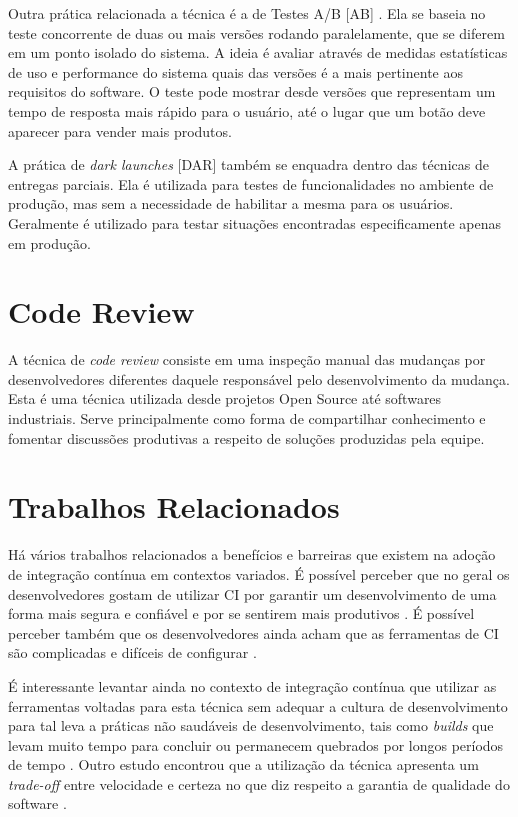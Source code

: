 Outra prática relacionada a técnica é a de Testes A/B [AB] \cite{testsAB}. Ela se baseia no teste concorrente de duas ou mais versões rodando paralelamente, que se diferem em um ponto isolado do sistema. A ideia é avaliar através de medidas estatísticas de uso e performance do sistema quais das versões é a mais pertinente aos requisitos do software. O teste pode mostrar desde versões que representam um tempo de resposta mais rápido para o usuário, até o lugar que um botão deve aparecer para vender mais produtos.

A prática de \emph{dark launches} [DAR] \cite{devAndDeploymentFB} também se enquadra dentro das técnicas de entregas parciais. Ela é utilizada para testes de funcionalidades no ambiente de produção, mas sem a necessidade de habilitar a mesma para os usuários. Geralmente é utilizado para testar situações encontradas especificamente apenas em produção.  


\section{Code Review}

A técnica de \emph{code review} \cite{codeReview} consiste em uma inspeção manual das mudanças por desenvolvedores diferentes daquele responsável pelo desenvolvimento da mudança. Esta é uma técnica utilizada desde projetos Open Source até softwares industriais. Serve principalmente como forma de compartilhar conhecimento e fomentar discussões produtivas a respeito de soluções produzidas pela equipe.

\section{Trabalhos Relacionados}

Há vários trabalhos relacionados a benefícios e barreiras que existem na adoção de integração contínua em contextos variados. É possível perceber que no geral os desenvolvedores gostam de utilizar CI por garantir um desenvolvimento de uma forma mais segura e confiável \cite{googleCi} e por se sentirem mais produtivos \cite{hilton2016}. É possível perceber também que os desenvolvedores ainda acham que as ferramentas de CI são complicadas e difíceis de configurar \cite{hilton2016}. 

É interessante levantar ainda no contexto de integração contínua que utilizar as ferramentas voltadas para esta técnica sem adequar a cultura de desenvolvimento para tal leva a práticas não saudáveis de desenvolvimento, tais como \emph{builds} que levam muito tempo para concluir ou permanecem quebrados por longos períodos de tempo  \cite{citheater2019}. Outro estudo encontrou que a utilização da técnica apresenta um \emph{trade-off} entre velocidade e certeza no que diz respeito a garantia de qualidade do software \cite{hilton2016}.


